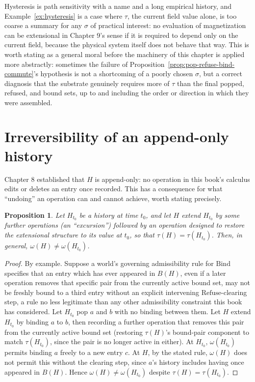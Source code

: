 \documentclass[11pt]{book}
\newtheorem{proposition}[theorem]{Proposition}
\begin{document}
Hysteresis is path sensitivity with a name and a long empirical history, and Example~\ref{ex:hysteresis} is a case where $\tau$, the current field value alone, is too coarse a summary for any $\sigma$ of practical interest: no evaluation of magnetization can be extensional in Chapter 9's sense if it is required to depend only on the current field, because the physical system itself does not behave that way. This is worth stating as a general moral before the machinery of this chapter is applied more abstractly: sometimes the failure of Proposition~\ref{prop:pop-refuse-bind-commute}'s hypothesis is not a shortcoming of a poorly chosen $\sigma$, but a correct diagnosis that the substrate genuinely requires more of $\tau$ than the final popped, refused, and bound sets, up to and including the order or direction in which they were assembled.

\section{Irreversibility of an append-only history}

Chapter 8 established that $H$ is append-only: no operation in this book's calculus edits or deletes an entry once recorded. This has a consequence for what ``undoing'' an operation can and cannot achieve, worth stating precisely.

\begin{proposition}
\label{prop:irreversibility}
Let $H_{t_0}$ be a history at time $t_0$, and let $H$ extend $H_{t_0}$ by some further operations (an ``excursion'') followed by an operation designed to restore the extensional structure to its value at $t_0$, so that $\tau(H)=\tau(H_{t_0})$. Then, in general, $\omega(H)\ne\omega(H_{t_0})$.
\end{proposition}
\begin{proof}
By example. Suppose a world's governing admissibility rule for $\mathrm{Bind}$ specifies that an entry which has ever appeared in $B(H)$, even if a later operation removes that specific pair from the currently active bound set, may not be freshly bound to a third entry without an explicit intervening $\mathrm{Refuse}$-clearing step, a rule no less legitimate than any other admissibility constraint this book has considered. Let $H_{t_0}$ pop $a$ and $b$ with no binding between them. Let $H$ extend $H_{t_0}$ by binding $a$ to $b$, then recording a further operation that removes this pair from the currently active bound set (restoring $\tau(H)$'s bound-pair component to match $\tau(H_{t_0})$, since the pair is no longer active in either). At $H_{t_0}$, $\omega(H_{t_0})$ permits binding $a$ freely to a new entry $c$. At $H$, by the stated rule, $\omega(H)$ does not permit this without the clearing step, since $a$'s history includes having once appeared in $B(H)$. Hence $\omega(H)\ne\omega(H_{t_0})$ despite $\tau(H)=\tau(H_{t_0})$.
\end{proof}
\end{document}
